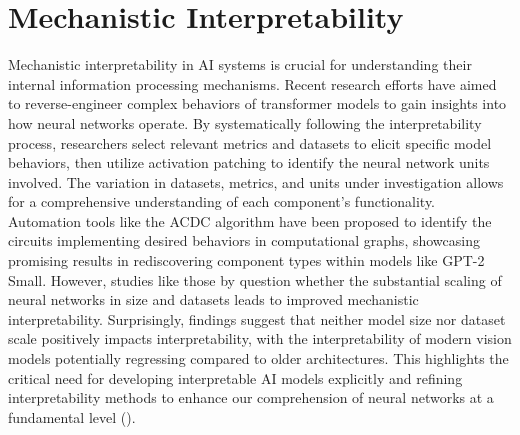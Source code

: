 \documentclass{article} %
\begin{document}
\section{Mechanistic Interpretability}
Mechanistic interpretability in AI systems is crucial for understanding their internal information processing mechanisms. Recent research efforts have aimed to reverse-engineer complex behaviors of transformer models to gain insights into how neural networks operate. By systematically following the interpretability process, researchers select relevant metrics and datasets to elicit specific model behaviors, then utilize activation patching to identify the neural network units involved. The variation in datasets, metrics, and units under investigation allows for a comprehensive understanding of each component's functionality. Automation tools like the ACDC algorithm have been proposed to identify the circuits implementing desired behaviors in computational graphs, showcasing promising results in rediscovering component types within models like GPT-2 Small. However, studies like those by \cite{conmy2023towards} question whether the substantial scaling of neural networks in size and datasets leads to improved mechanistic interpretability. Surprisingly, findings suggest that neither model size nor dataset scale positively impacts interpretability, with the interpretability of modern vision models potentially regressing compared to older architectures. This highlights the critical need for developing interpretable AI models explicitly and refining interpretability methods to enhance our comprehension of neural networks at a fundamental level (\cite{zimmermann2023scale}).



\end{document}
